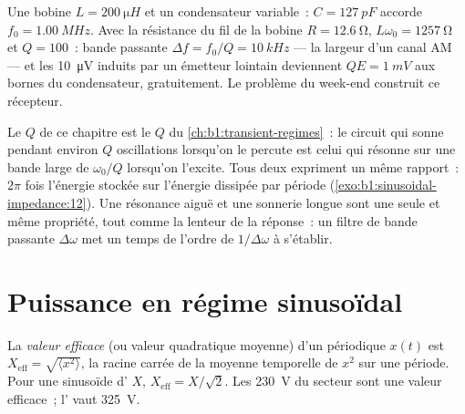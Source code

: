 \begin{example}\label{ex:b1:sinusoidal-impedance:radio}
Une bobine $L = \qty{200}{\micro H}$ et un condensateur variable~: $C =
\qty{127}{pF}$ accorde $f_0 = \qty{1.00}{MHz}$. Avec la résistance du
fil de la bobine $R = \qty{12.6}{\ohm}$, $L\omega_0 = \qty{1257}{\ohm}$
et $Q = 100$~: bande passante $\Delta f = f_0/Q = \qty{10}{kHz}$ --- la
largeur d'un canal AM --- et les \qty{10}{\micro V} induits par un
émetteur lointain deviennent $QE = \qty{1}{mV}$ aux bornes du
condensateur, gratuitement. Le problème du week-end construit ce récepteur.
\end{example}

\begin{remark}[Encore $Q$]\label{rem:b1:sinusoidal-impedance:Q}
Le $Q$ de ce chapitre est le $Q$ du \cref{ch:b1:transient-regimes}~: le
circuit qui sonne pendant environ $Q$ oscillations lorsqu'on le
percute est celui qui résonne sur une bande large de $\omega_0/Q$
lorsqu'on l'excite. Tous deux expriment un même rapport~: $2\pi$ fois
l'énergie stockée sur l'énergie dissipée par période
(\cref{exo:b1:sinusoidal-impedance:12}). Une résonance aiguë et une
sonnerie longue sont une seule et même propriété, tout comme la lenteur
de la réponse~: un filtre de bande passante $\Delta\omega$ met un temps
de l'ordre de $1/\Delta\omega$ à s'établir.
\end{remark}

\section{Puissance en régime sinusoïdal}

\begin{definition}\label{def:b1:sinusoidal-impedance:rms}
La \emph{valeur efficace} (ou valeur quadratique moyenne) d'un 
périodique $x(t)$ est $X_{\mathrm{eff}} = \sqrt{\langle x^2\rangle}$, la
racine carrée de la moyenne temporelle de $x^2$ sur une période. Pour
une sinusoïde d' $X$, $X_{\mathrm{eff}} = X/\sqrt2$. Les
\qty{230}{V} du secteur sont une valeur efficace~; l' vaut
\qty{325}{V}.
\end{definition}

